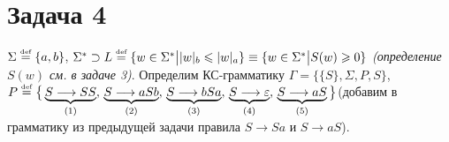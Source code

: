 \documentclass[a4paper]{article}
\def\eqdef{\overset{\mbox{\tiny def}}{=}}
\begin{document}
\section*{Задача 4}
$\Sigma\eqdef\{a,b\}$, $\Sigma^*\supset L\eqdef\{w\in\Sigma^*\big||w|_b\leqslant|w|_a\}\equiv\{w\in\Sigma^*\big|S(w)\geqslant 0\}$ {\em (определение $S(w)$ см. в задаче 3)}.\newline
Определим КС-грамматику $\Gamma=\{\{S\},\Sigma,P,S\}$,\newline
$P\eqdef\big\{\underbrace{S\longrightarrow SS}_{(1)},\,\underbrace{S\longrightarrow aSb}_{(2)},\,\underbrace{S\longrightarrow bSa}_{(3)},\,\underbrace{S\longrightarrow \varepsilon}_{(4)},\,\underbrace{S\longrightarrow aS}_{(5)}\big\}$\newline (добавим в грамматику из предыдущей задачи правила $S\longrightarrow Sa$ и $S\longrightarrow aS$).\newline
\end{document}
